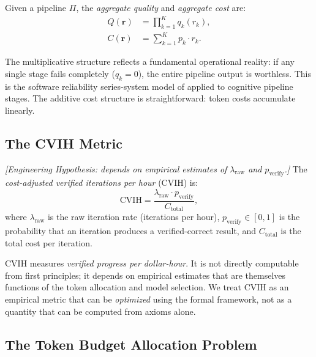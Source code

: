 \begin{definition}
\label{def:econ-quality-cost}
Given a pipeline $\Pi$, the \emph{aggregate quality} and \emph{aggregate cost} are:
\begin{align}
    Q(\mathbf{r}) &= \prod_{k=1}^{K} q_k(r_k), \label{eq:econ-mult-quality} \\
    C(\mathbf{r}) &= \sum_{k=1}^{K} p_k \cdot r_k. \label{eq:econ-add-cost}
\end{align}
\end{definition}

The multiplicative structure reflects a fundamental operational reality: if any single stage fails completely ($q_k = 0$), the entire pipeline output is worthless. This is the software reliability series-system model of \citep{barlow1975} applied to cognitive pipeline stages. The additive cost structure is straightforward: token costs accumulate linearly.

\subsection{The CVIH Metric}

\begin{definition}[CVIH]
\label{def:econ-cvih}
\emph{[Engineering Hypothesis: depends on empirical estimates of $\lambda_{\text{raw}}$ and $p_{\text{verify}}$.]}
The \emph{cost-adjusted verified iterations per hour} (CVIH) is:
\begin{equation}\label{eq:econ-cvih-def}
    \text{CVIH} = \frac{\lambda_{\text{raw}} \cdot p_{\text{verify}}}{C_{\text{total}}},
\end{equation}
where $\lambda_{\text{raw}}$ is the raw iteration rate (iterations per hour), $p_{\text{verify}} \in [0,1]$ is the probability that an iteration produces a verified-correct result, and $C_{\text{total}}$ is the total cost per iteration.
\end{definition}

CVIH measures \emph{verified progress per dollar-hour}. It is not directly computable from first principles; it depends on empirical estimates that are themselves functions of the token allocation and model selection. We treat CVIH as an empirical metric that can be \emph{optimized} using the formal framework, not as a quantity that can be computed from axioms alone.

\subsection{The Token Budget Allocation Problem}

